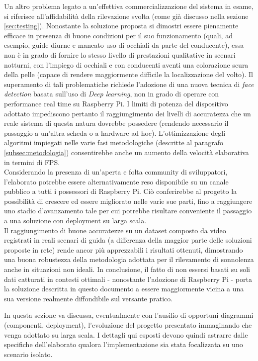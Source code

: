 \documentclass[12pt]{article}
\begin{document}
Un altro problema legato a un'effettiva commercializzazione del sistema in esame, si riferisce all'affidabilità della rilevazione svolta (come già discusso nella sezione \ref{sec:testing}). Nonostante la soluzione proposta si dimostri essere pienamente efficace in presenza di buone condizioni per il suo funzionamento (quali, ad esempio, guide diurne e mancato uso di occhiali da parte del conducente), essa non è in grado di fornire lo stesso livello di prestazioni qualitative in scenari notturni, con l'impiego di occhiali e con conducenti aventi una colorazione scura della pelle (capace di rendere maggiormente difficile la localizzazione del volto). Il superamento di tali problematiche richiede l'adozione di una nuova tecnica di \textit{face detection} basata sull'uso di \textit{Deep learning}, non in grado di operare con performance real time su Raspberry Pi. I limiti di potenza del dispositivo adottato impediscono pertanto il raggiungimento dei livelli di accuratezza che un reale sistema di questa natura dovrebbe possedere (rendendo necessario il passaggio a un'altra scheda o a hardware ad hoc). L'ottimizzazione degli algoritmi impiegati nelle varie fasi metodologiche (descritte al paragrafo \ref{subsec:metodologia}) consentirebbe anche un aumento della velocità elaborativa in termini di FPS.\\

Considerando la presenza di un'aperta e folta community di sviluppatori, l'elaborato potrebbe essere alternativamente reso disponibile su un canale pubblico a tutti i possessori di Raspberry Pi. Ciò conferirebbe al progetto la possibilità di crescere ed essere migliorato nelle varie sue parti, fino a raggiungere uno stadio d'avanzamento tale per cui potrebbe risultare conveniente il passaggio a una soluzione con deployment su larga scala.\\

Il raggiungimento di buone accuratezze su un dataset composto da video registrati in reali scenari di guida (a differenza della maggior parte delle soluzioni proposte in rete) rende ancor più apprezzabili i risultati ottenuti, dimostrando una buona robustezza della metodologia adottata per il rilevamento di sonnolenza anche in situazioni non ideali. In conclusione, il fatto di non essersi basati su soli dati catturati in contesti ottimali - nonostante l'adozione di Raspberry Pi - porta la soluzione descritta in questo documento a essere maggiormente vicina a una sua versione realmente diffondibile sul versante pratico.

\iffalse
In questa sezione va discussa, eventualmente con l'ausilio di opportuni diagrammi (componenti, deployment), l'evoluzione del progetto presentato immaginando che venga adottato su larga scala. I dettagli qui esposti devono quindi astrarre dalle specifiche dell'elaborato qualora l'implementazione sia stata focalizzata su uno scenario isolato.\\
\end{document}
